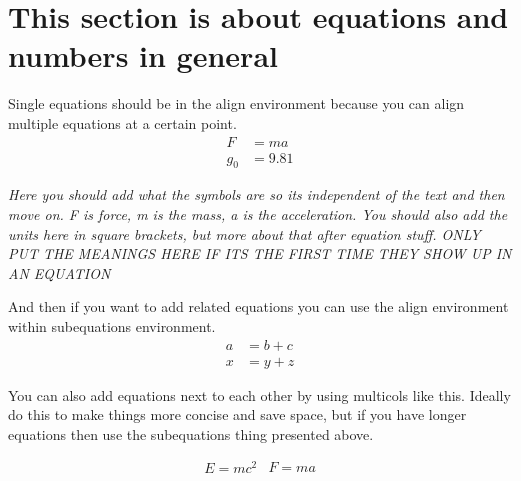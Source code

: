 \documentclass[../main.tex]{subfiles}
\begin{document}
\section{This section is about equations and numbers in general}
Single equations should be in the align environment because you can align multiple equations at a certain point. 
\begin{align}
    F &= ma \label{eq: Newtons-law}\\
    g_{0} &= 9.81 \label{eq: gravity} 
\end{align}
\begin{center}
\textit{Here you should add what the symbols are so its independent of the text and then move on. F \un{}{\newton} is force, m \un{}{\kilogram} is the mass, a \un{}{\meter\per\second\squared} is the acceleration. You should also add the units here in square brackets, but more about that after equation stuff. ONLY PUT THE MEANINGS HERE IF ITS THE FIRST TIME THEY SHOW UP IN AN EQUATION}

\end{center}
And then if you want to add related equations you can use the align environment within subequations environment. 
\begin{subequations}
\begin{align}
  a &= b + c \\
  x &= y + z
\end{align}
\end{subequations}

You can also add equations next to each other by using multicols like this. Ideally do this to make things more concise and save space, but if you have longer equations then use the subequations thing presented above. 
\begin{multicols}{2}
\begin{subequations}
\begin{align}
E = mc^2
\end{align}

\begin{align}
F = ma
\end{align}
\end{subequations}
\end{multicols}
\end{document}
